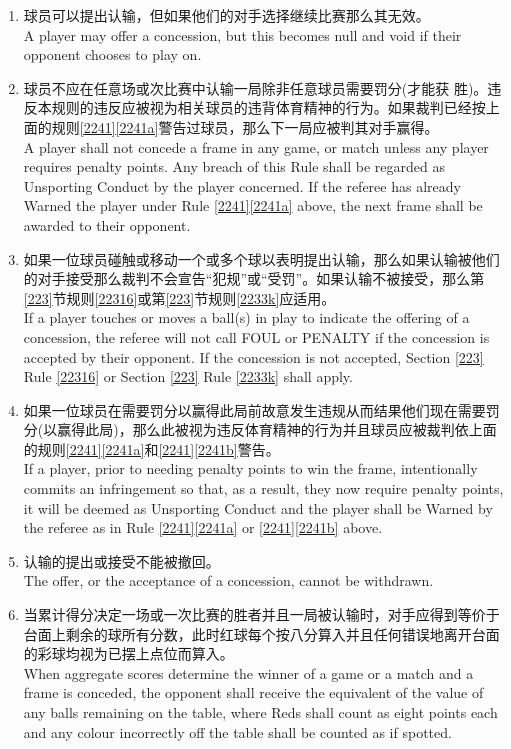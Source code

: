 \begin{enumerate}[label=(\alph*)]
    \item 球员可以提出认输，但如果他们的对手选择继续比赛那么其无效。\\
    A player may offer a concession, but this becomes null and void if their opponent chooses to play on.
    \item 球员不应在任意场或次比赛中认输一局除非任意球员需要罚分(才能获
    胜)。违反本规则的违反应被视为相关球员的违背体育精神的行为。如果裁判已经按上面的规则\ref{2241}\ref{2241a}警告过球员，那么下一局应被判其对手赢得。\\
    A player shall not concede a frame in any game, or match unless any player requires penalty points. Any breach of this Rule shall be regarded as Unsporting Conduct by the player concerned. If the referee has already Warned the player under Rule \ref{2241}\ref{2241a} above, the next frame shall be awarded to their opponent.
    \item \label{2242c}如果一位球员碰触或移动一个或多个球以表明提出认输，那么如果认输被他们的对手接受那么裁判不会宣告``犯规''或``受罚''。如果认输不被接受，那么第\ref{223}节规则\ref{22316}或第\ref{223}节规则\ref{2233k}应适用。\\
    If a player touches or moves a ball(s) in play to indicate the offering of a concession, the referee will not call FOUL or PENALTY if the concession is accepted by their opponent. If the concession is not accepted, Section \ref{223} Rule \ref{22316} or Section \ref{223} Rule \ref{2233k} shall apply.
    \item 如果一位球员在需要罚分以赢得此局前故意发生违规从而结果他们现在需要罚分(以赢得此局)，那么此被视为违反体育精神的行为并且球员应被裁判依上面的规则\ref{2241}\ref{2241a}和\ref{2241}\ref{2241b}警告。\\
    If a player, prior to needing penalty points to win the frame, intentionally commits an infringement so that, as a result, they now require penalty points, it will be deemed as Unsporting Conduct and the player shall be Warned by the referee as in Rule \ref{2241}\ref{2241a} or \ref{2241}\ref{2241b} above.
    \item 认输的提出或接受不能被撤回。\\
    The offer, or the acceptance of a concession, cannot be withdrawn.
    \item 当累计得分决定一场或一次比赛的胜者并且一局被认输时，对手应得到等价于台面上剩余的球所有分数，此时红球每个按八分算入并且任何错误地离开台面的彩球均视为已摆上点位而算入。\\
    When aggregate scores determine the winner of a game or a match and a frame is conceded, the opponent shall receive the equivalent of the value of any balls remaining on the table, where Reds shall count as eight points each and any colour incorrectly off the table shall be counted as if spotted.
\end{enumerate}

